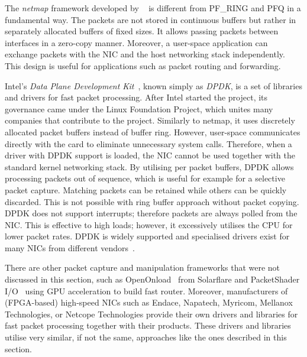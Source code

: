 The \emph{netmap} framework developed by ~\citeauthor{Rizzo-2012-Netmap} is different from PF\_RING and PFQ in a fundamental way. The packets are not stored in continuous buffers but rather in separately allocated buffers of fixed sizes. It allows passing packets between interfaces in a zero-copy manner. Moreover, a user-space application can exchange packets with the NIC and the host networking stack independently. This design is useful for applications such as packet routing and forwarding.

Intel's \emph{Data Plane Development Kit}~\cite{LFP--Data}, known simply as \emph{DPDK}, is a set of libraries and drivers for fast packet processing. After Intel started the project, its governance came under the Linux Foundation Project, which unites many companies that contribute to the project. Similarly to netmap, it uses discretely allocated packet buffers instead of buffer ring. However, user-space communicates directly with the card to eliminate unnecessary system calls. Therefore, when a driver with DPDK support is loaded, the NIC cannot be used together with the standard kernel networking stack. By utilising per packet buffers, DPDK allows processing packets out of sequence, which is useful for example for a selective packet capture. Matching packets can be retained while others can be quickly discarded. This is not possible with ring buffer approach without packet copying. DPDK does not support interrupts; therefore packets are always polled from the NIC. This is effective to high loads; however, it excessively utilises the CPU for lower packet rates. DPDK is widely supported and specialised drivers exist for many NICs from different vendors~\cite{LFP--DPDK}. 

There are other packet capture and manipulation frameworks that were not discussed in this section, such as OpenOnload~\cite{Mansley-2008-Getting} from Solarflare and PacketShader I/O~\cite{Han-2010-PacketShader} using GPU acceleration to build fast router. Moreover, manufacturers of (FPGA-based) high-speed NICs such as Endace, Napatech, Myricom, Mellanox Technologies, or Netcope Technologies provide their own drivers and libraries for fast packet processing together with their products. These drivers and libraries utilise very similar, if not the same, approaches like the ones described in this section.

